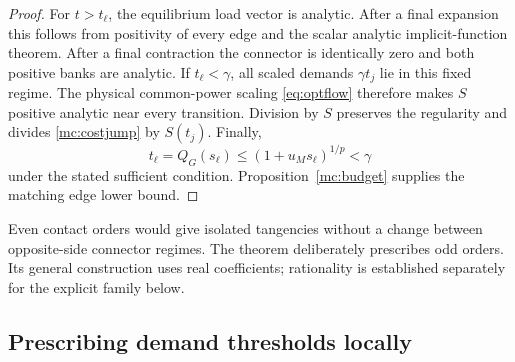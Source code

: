 \begin{proof}
For $t>t_\ell$, the equilibrium load vector is analytic. After a final expansion this follows from positivity of every edge and the scalar analytic implicit-function theorem. After a final contraction the connector is identically zero and both positive banks are analytic. If $t_\ell<\gamma$, all scaled demands $\gamma t_j$ lie in this fixed regime. The physical common-power scaling \eqref{eq:optflow} therefore makes $S$ positive analytic near every transition. Division by $S$ preserves the regularity and divides \eqref{mc:costjump} by $S(t_j)$. Finally,
\begin{equation}
 t_\ell=Q_G(s_\ell)\le(1+u_Ms_\ell)^{1/p}<\gamma
\end{equation}
under the stated sufficient condition. Proposition~\ref{mc:budget} supplies the matching edge lower bound.
\end{proof}

Even contact orders would give isolated tangencies without a change between opposite-side connector regimes. The theorem deliberately prescribes odd orders. Its general construction uses real coefficients; rationality is established separately for the explicit family below.

\subsection{Prescribing demand thresholds locally}

